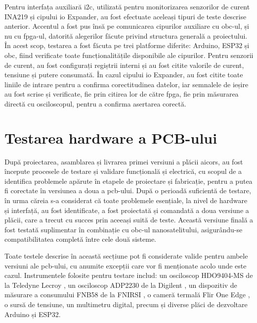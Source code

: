 \documentclass[12pt,a4paper]{report}
\begin{document}
Pentru interfața auxiliară \gls{i2c}, utilizată pentru monitorizarea senzorilor de curent INA219 și cipului \gls{io} Expander, au fost efectuate aceleași tipuri de teste descrise anterior. Accentul a fost pus însă pe comunicarea cipurilor auxiliare cu \gls{obc}-ul, și nu cu \gls{fpga}-ul, datorită alegerilor făcute privind structura generală a proiectului. În acest scop, testarea a fost făcuta pe trei platforme diferite: Arduino, ESP32 și \gls{obc}, fiind verificate toate funcționalitățile disponibile ale cipurilor. Pentru senzorii de curent, au fost configurați regiștrii interni și au fost citite valorile de curent, tensiune și putere consumată. În cazul cipului \gls{io} Expander, au fost citite toate liniile de intrare pentru a confirma corectitudinea datelor, iar semnalele de ieșire au fost scrise și verificate, fie prin citirea lor de către \gls{fpga}, fie prin măsurarea directă cu osciloscopul, pentru a confirma asertarea corectă.

\section{Testarea hardware a PCB-ului}
După proiectarea, asamblarea și livrarea primei versiuni a plăcii \gls{aicors}, au fost începute procesele de testare și validare funcțională și electrică, cu scopul de a identifica problemele apărute în etapele de proiectare și fabricație, pentru a putea fi corectate în versiunea a doua a \gls{pcb}-ului. După o perioadă suficientă de testare, în urma căreia s-a considerat că toate problemele esențiale, la nivel de hardware și interfață, au fost identificate, a fost proiectată și comandată a doua versiune a plăcii, care a trecut cu succes prin aceeași suită de teste. Această versiune finală a fost testată suplimentar în combinație cu \gls{obc}-ul nanosatelitului, asigurându-se compatibilitatea completă între cele două sisteme.

Toate testele descrise în această secțiune pot fi considerate valide pentru ambele versiuni ale \gls{pcb}-ului, cu anumite excepții care vor fi menționate acolo unde este cazul. Instrumentele folosite pentru testare includ: un osciloscop HDO9404-MS de la Teledyne Lecroy \cite{oscilloscope_lecroy}, un osciloscop ADP2230 de la Digilent \cite{oscilloscope_digilent}, un dispozitiv de măsurare a consumului FNB58 de la FNIRSI \cite{usb_power_meter}, o cameră termală Flir One Edge \cite{thermal_camera}, o sursă de tensiune, un multimetru digital, precum și diverse plăci de dezvoltare Arduino și ESP32.
\end{document}
